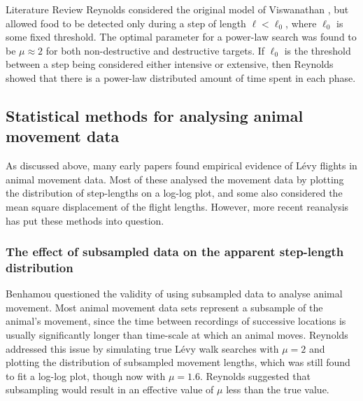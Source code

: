 \begin{section}{Literature Review \label{sec:litreview}}
Reynolds \cite{Reynolds_2006} considered the original model of Viswanathan \etal \cite{Viswanathan_1999}, but allowed food to be detected only during a step of length $\ell < \ell_0$, where $\ell_0$ is some fixed threshold.
The optimal parameter for a power-law search was found to be $\mu \approx 2$ for both non-destructive and destructive targets.
If $\ell_0$ is the threshold between a step being considered either intensive or extensive, then Reynolds showed that there is a power-law distributed amount of time spent in each phase.

\subsection{Statistical methods for analysing animal movement data}

As discussed above, many early papers \cite{Cole_1995,Viswanathan_1996,Viswanathan_1999,Marell_2002,Ayala_Orozco_2004,Sims_2008,Reynolds_2009_fractional,Reynolds_2007_moths,Reynolds_2007_bees} found empirical evidence of L\'{e}vy flights in animal movement data.
Most of these \cite{Cole_1995,Viswanathan_1996,Viswanathan_1999,Ayala_Orozco_2004,Sims_2008,Reynolds_2007_drosophila,Reynolds_2007_moths} analysed the movement data by plotting the distribution of step-lengths on a log-log plot, and some \cite{Reynolds_2007_bees,Sims_2008,Ayala_Orozco_2004,Marell_2002} also considered the mean square displacement of the flight lengths.
However, more recent reanalysis has put these methods into question.

\subsubsection{The effect of subsampled data on the apparent step-length distribution}

Benhamou \cite{Benhamou_2007} questioned the validity of using subsampled data to analyse animal movement.
Most animal movement data sets represent a subsample of the animal's movement, since the time between recordings of successive locations is usually significantly longer than time-scale at which an animal moves.
Reynolds \cite{Reynolds_2008_comment} addressed this issue by simulating true L\'{e}vy walk searches with $\mu=2$ and plotting the distribution of subsampled movement lengths, which was still found to fit a log-log plot, though now with $\mu = 1.6$.
Reynolds suggested that subsampling would result in an effective value of $\mu$ less than the true value.


\end{section}
